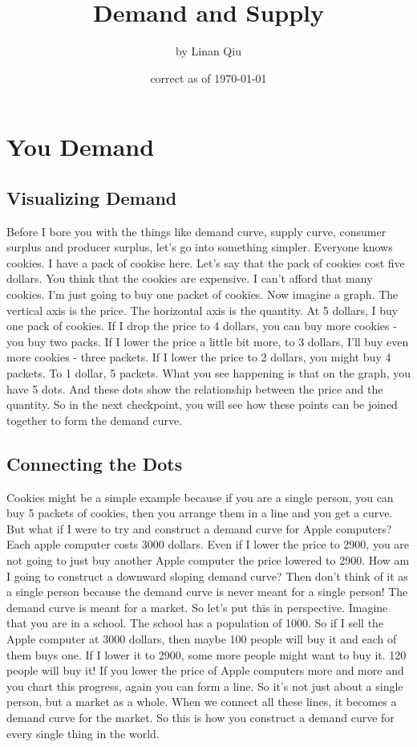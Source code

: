 \documentclass[DIV=calc,11pt,parskip,numbers=noenddot]{scrartcl} %
\title{Demand and Supply}
\author{\large by Linan Qiu}
\date{\small correct as of \today}
\begin{document}
\maketitle
\tableofcontents

\section{You Demand}
\subsection{Visualizing Demand}
Before I bore you with the things like demand curve, supply curve, consumer surplus and producer surplus, let's go into something simpler. Everyone knows cookies. I have a pack of cookise here. Let's say that the pack of cookies cost five dollars. You think that the cookies are expensive. I can't afford that many cookies. I'm just going to buy one packet of cookies. Now imagine a graph. The vertical axis is the price. The horizontal axis is the quantity. At 5 dollars, I buy one pack of cookies. If I drop the price to 4 dollars, you can buy more cookies - you buy two packs. If I lower the price a little bit more, to 3 dollars, I'll buy even more cookies - three packets. If I lower the price to 2 dollars, you might buy 4 packets. To 1 dollar, 5 packets. What you see happening is that on the graph, you have 5 dots. And these dots show the relationship between the price and the quantity. So in the next checkpoint, you will see how these points can be joined together to form the demand curve.
\subsection{Connecting the Dots}
Cookies might be a simple example because if you are a single person, you can buy 5 packets of cookies, then you arrange them in a line and you get a curve. But what if I were to try and construct a demand curve for Apple computers? Each apple computer costs 3000 dollars. Even if I lower the price to 2900, you are not going to just buy another Apple computer the price lowered to 2900. How am I going to construct a downward sloping demand curve? Then don't think of it as a single person because the demand curve is never meant for a single person! The demand curve is meant for a market. So let's put this in perspective. Imagine that you are in a school. The school has a population of 1000. So if I sell the Apple computer at 3000 dollars, then maybe 100 people will buy it and each of them buys one. If I lower it to 2900, some more people might want to buy it. 120 people will buy it! If you lower the price of Apple computers more and more and you chart this progress, again you can form a line. So it's not just about a single person, but a market as a whole. When we connect all these lines, it becomes a demand curve for the market. So this is how you construct a demand curve for every single thing in the world.
\end{document}

